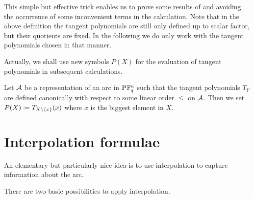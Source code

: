     This simple but effective trick enables us to prove some results of  and  avoiding the occurrence of some inconvenient terms in the calculation.
    Note that in the above definition the tangent polynomials are still only defined up to scalar factor, but their quotients are fixed.
    In the following we do only work with the tangent polynomials chosen in that manner.

    Actually, we shall use new symbols $P(X)$ for the evaluation of tangent polynomials in subsequent calculations.

\begin{definition}\label{tang-pol-eval}
    Let $\mathcal{A}$ be a representation of an arc in $\P \field{q}^n$ such that the tangent polynomials $T_Y$ are defined canonically with respect to some linear order $\leq$ on $\mathcal{A}$. Then we set $P(X)\defeq T_{X\setminus\set{x}}(x)$ where $x$ is the biggest element in  $X$.
\end{definition}

\section{Interpolation formulae}

An elementary but particularly nice idea is to use interpolation to capture information about the arc.

There are two basic possibilities to apply interpolation. 

